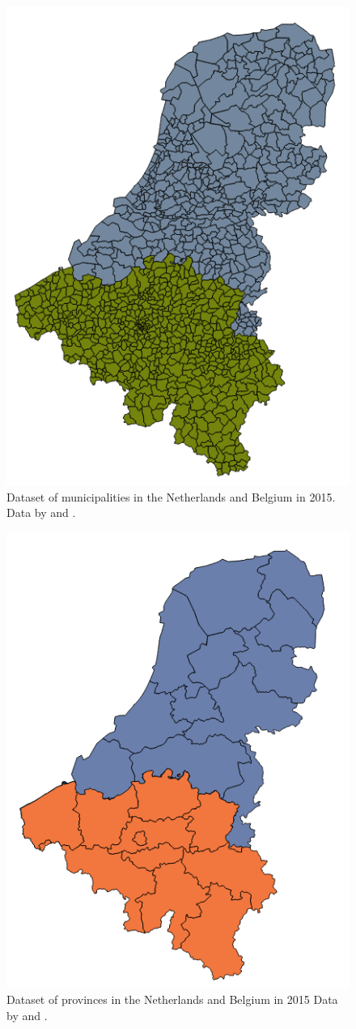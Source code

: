 \begin{figure}
	\centering
	\includegraphics[width=0.5\linewidth]{figs/Municipalities.png}
	\caption{Dataset of municipalities in the Netherlands and Belgium in 2015. Data by \cite{DATA:Kadaster} and \cite{DATA:GADM}.}
	\label{fig:municipalities}
\end{figure}

\begin{figure}
	\centering
	\includegraphics[width=0.5\linewidth]{figs/Provinces.png}
	\caption{Dataset of provinces in the Netherlands and Belgium in 2015 Data by \cite{DATA:Kadaster} and \cite{DATA:GADM}.}
	\label{fig:provinces}
\end{figure}

